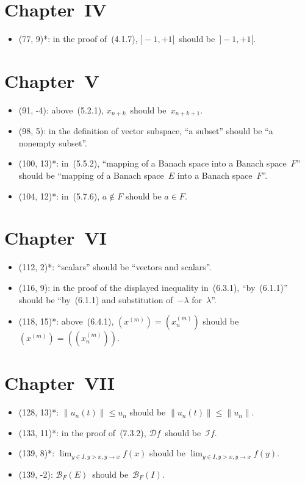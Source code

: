\documentclass[letterpaper,12pt]{article}
\newcommand{\B}{\mathcal{B}}
\renewcommand{\Im}{\mathcal{I}}
\newcommand{\norm}[1]{\lVert{#1}\rVert}
\begin{document}
\section*{Chapter~IV}
\begin{itemize}
\item (77, 9)*: in the proof of~(4.1.7), \(]-1,+1]\)~should be~\(]-1,+1[\).
\end{itemize}

\section*{Chapter~V}
\begin{itemize}
\item (91, -4): above~(5.2.1), \(x_{n+k}\)~should be~\(x_{n+k+1}\).
\item (98, 5): in the definition of vector subspace, ``a subset'' should be ``a nonempty subset''.
\item (100, 13)*: in~(5.5.2), ``mapping of a Banach space into a Banach space~\(F\)'' should be ``mapping of a Banach space~\(E\) into a Banach space~\(F\)''.
\item (104, 12)*: in~(5.7.6), \(a\not\in F\) should be \(a\in F\).
\end{itemize}

\section*{Chapter~VI}
\begin{itemize}
\item (112, 2)*: ``scalars'' should be ``vectors and scalars''.
\item (116, 9): in the proof of the displayed inequality in~(6.3.1), ``by~(6.1.1)'' should be ``by~(6.1.1) and substitution of~\(-\lambda\) for~\(\lambda\)''.
\item (118, 15)*: above~(6.4.1), \((x^{(m)})=(x^{(m)}_n)\) should be \((x^{(m)})=((x^{(m)}_n))\).
\end{itemize}

\section*{Chapter~VII}
\begin{itemize}
\item (128, 13)*: \(\norm{u_n(t)}\le u_n\) should be \(\norm{u_n(t)}\le\norm{u_n}\).
\item (133, 11)*: in the proof of~(7.3.2), \(\mathcal{D}f\)~should be~\(\Im f\).
\item (139, 8)*: \(\lim_{y\in I,y>x,y\to x}f(x)\) should be \(\lim_{y\in I,y>x,y\to x}f(y)\).
\item (139, -2): \(\B_F(E)\)~should be~\(\B_F(I)\).
\end{itemize}
\end{document}
